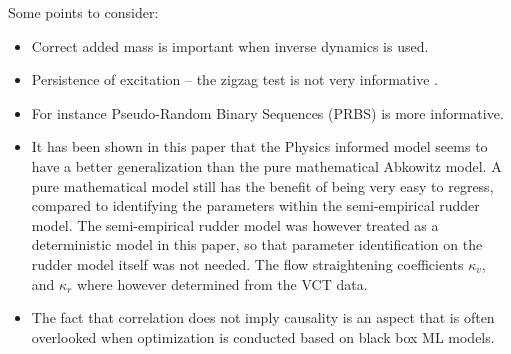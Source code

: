 Some points to consider:
\begin{itemize}
    \item Correct added mass is important when inverse dynamics is used.
    \item Persistence of excitation -- the zigzag test is not very informative \citep{sutulo_algorithm_2014}.
    \item For instance Pseudo-Random Binary Sequences (PRBS) \citep{landau_digital_2006} is more informative.
    \item It has been shown in this paper that the Physics informed model seems to have a better generalization than the pure mathematical Abkowitz model. A pure mathematical model still has the benefit of being very easy to regress, compared to
          identifying the parameters within the semi-empirical rudder model. The semi-empirical rudder model was however treated as a deterministic model in this paper, so that parameter identification on the rudder model itself was not needed. The flow straightening coefficients $\kappa_v$, and $\kappa_r$ where however determined from the VCT data.

    \item The fact that correlation does not imply causality is an aspect that is often overlooked when optimization is conducted based on black box ML models.
\end{itemize}